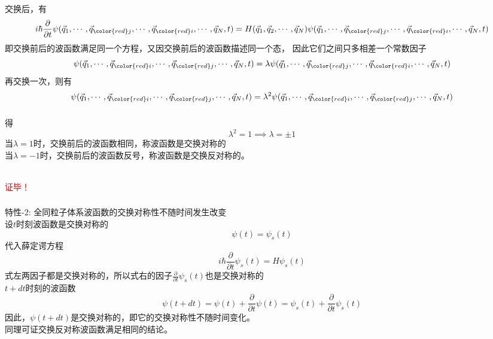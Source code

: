 \begin{frame}[label=current]
  \frametitle{}
交换后，有
\[i\hbar \frac{\partial }{\partial t} \psi(\vec{q}_1,\cdots, \vec{q}_{\color{red}j},\cdots,\vec{q}_{\color{red}i},\cdots,\vec{q}_N,t)=H(\vec{q}_1,\vec{q}_2,\cdots,\vec{q}_N)\psi(\vec{q}_1,\cdots, \vec{q}_{\color{red}j},\cdots,\vec{q}_{\color{red}i},\cdots,\vec{q}_N,t) \]
即交换前后的波函数满足同一个方程，又因交换前后的波函数描述同一个态， 因此它们之间只多相差一个常数因子
\[\psi(\vec{q}_1,\cdots, \vec{q}_{\color{red}i},\cdots,\vec{q}_{\color{red}j},\cdots,\vec{q}_N,t) = \lambda \psi(\vec{q}_1,\cdots, \vec{q}_{\color{red}j},\cdots,\vec{q}_{\color{red}i},\cdots,\vec{q}_N,t)\]
再交换一次，则有
\[\psi(\vec{q}_1,\cdots, \vec{q}_{\color{red}i},\cdots,\vec{q}_{\color{red}j},\cdots,\vec{q}_N,t) = \lambda ^2 \psi(\vec{q}_1,\cdots, \vec{q}_{\color{red}i},\cdots,\vec{q}_{\color{red}j},\cdots,\vec{q}_N,t)\]
\end{frame} 

\begin{frame}[label=current]
  \frametitle{}
得
\[ \lambda ^2 =1 \implies \lambda = \pm 1\]
当$\lambda = 1$时，交换前后的波函数相同，称波函数是交换对称的 \\
当$\lambda = -1$时，交换前后的波函数反号，称波函数是交换反对称的。 

~~\\ 
\textcolor{red}{证毕！}
\end{frame} 

\begin{frame}[label=current]
  \frametitle{}
  \alert{特性-2:} 全同粒子体系波函数的交换对称性不随时间发生改变\\ 
  \证 设$t$时刻波函数是交换对称的
  \[ \psi(t) = \psi _s(t)\]
  代入薛定谔方程
  \[i\hbar \frac{\partial }{\partial t} \psi _s (t ) =H \psi _s (t ) \]
  式左两因子都是交换对称的，所以式右的因子$\frac{\partial }{\partial t} \psi _s (t )$也是交换对称的 \\
  $t+dt$时刻的波函数
  \[ \psi(t+ dt) =\psi (t) + \frac{\partial }{\partial t} \psi (t )= \psi _s(t) + \frac{\partial }{\partial t} \psi _s (t ) \]
  因此，$\psi(t+ dt)$是交换对称的，即它的交换对称性不随时间变化。\\
  同理可证交换反对称波函数满足相同的结论。
\end{frame} 

